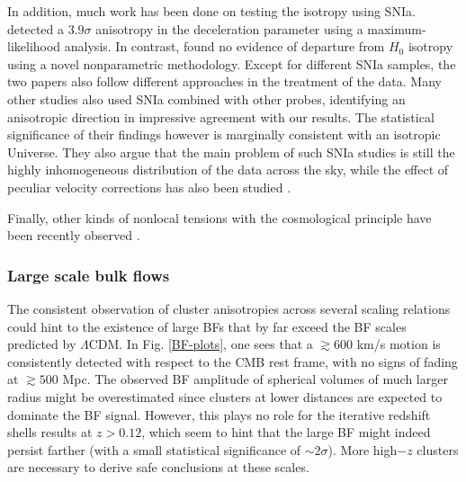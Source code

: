 \documentclass{aa}   %
\begin{document}
In addition, much work has been done on testing the isotropy using SNIa. \citet{colin19} detected a $3.9\sigma$ anisotropy in the deceleration parameter using a maximum-likelihood analysis. In contrast, \citet{soltis} found no evidence of departure from $H_0$ isotropy using a novel nonparametric methodology. Except for different SNIa samples, the two papers also follow different approaches in the treatment of the data. Many other studies \citep[e.g.,][]{chang15,deng,sun2,zhao19,salehi,hu} also used SNIa combined with other probes, identifying an anisotropic direction in impressive agreement with our results. The statistical significance of their findings however is marginally consistent with an isotropic Universe. They also argue that the main problem of such SNIa studies is still the highly inhomogeneous distribution of the data across the sky, while the effect of peculiar velocity corrections has also been studied \citep[e.g.,][]{huterer20,mohayaee}. 

Finally, other kinds of nonlocal tensions with the cosmological principle have been recently observed \citep{horvath,shamir}.

\subsubsection{Large scale bulk flows}

The consistent observation of cluster anisotropies across several scaling relations could hint to the existence of large BFs that by far exceed the BF scales predicted by $\Lambda$CDM. In Fig. \ref{BF-plots}, one sees that a $\gtrsim 600$ km/s motion is consistently detected with respect to the CMB rest frame, with no signs of fading at $\gtrsim 500$ Mpc. The observed BF amplitude of spherical volumes of much larger radius might be overestimated since clusters at lower distances are expected to dominate the BF signal. However, this plays no role for the iterative redshift shells results at $z>0.12$, which seem to hint that the large BF might indeed persist farther (with a small statistical significance of $\sim 2\sigma$). More high$-z$ clusters are necessary to derive safe conclusions at these scales.
\end{document}
